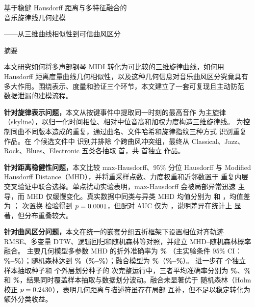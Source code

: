 \documentclass[UTF8,a4paper,12pt]{ctexart}
\newcommand{\abstractdata}[1]{{\bfseries\boldmath #1}}
\begin{document}
\thispagestyle{plain}

\begin{center}
  {\heiti{} 基于稳健 Hausdorff 距离与多特征融合的\\[0.18em]
  音乐旋律线几何建模\par}
  \vspace{0.3em}
  {\kaishu{}——从三维曲线相似性到可信曲风区分\par}
  \vspace{0.75em}
  {\heiti{} 摘\quad 要}
\end{center}

本文研究如何将多声部钢琴 MIDI 转化为可比较的三维旋律曲线，如何用
Hausdorff 距离度量曲线几何相似性，以及这种几何信息对音乐曲风区分究竟具有
多大作用。围绕表示、度量和验证三个环节，本文建立了一套可复现且主动防范
数据泄漏的建模流程。

\textbf{针对旋律表示问题，}本文从按键事件中提取同一时刻的最高音作
为主旋律（skyline），以归一化时间相位、相对中位音高和加权力度构造三维旋律线。
为控制同曲不同版本造成的重复，通过曲名、文件哈希和旋律指纹三种方式
识别重复作品。在 \abstractdata{\RawFileCount} 个候选文件中
识别并排除 \abstractdata{\CrossGenreGroupCount} 个跨曲风冲突组，最终从 Classical、Jazz、
Rock、Blues、Electronic 五类各抽取 \abstractdata{\PerGenreCount} 首，共
\abstractdata{\SampleCount} 首独立
作品。

\textbf{针对距离稳健性问题，}本文比较 max-Hausdorff、95\% 分位 Hausdorff
与 Modified Hausdorff Distance（MHD），并将重采样点数、力度权重和近邻数置于
重复内层交叉验证中联合选择。单点扰动实验表明，max-Hausdorff 会被局部异常迅速
主导，而 MHD 仅缓慢变化。真实数据中同类与异类 MHD 均值分别为
\abstractdata{\WithinMHD} 和 \abstractdata{\BetweenMHD}，均值差为
\abstractdata{\MHDGap}；\abstractdata{\PermutationCount} 次置换
检验得到 \abstractdata{$p=0.0001$}，但配对 AUC 仅为
\abstractdata{\PairAUC}，说明差异在统计上
显著，但分布重叠较大。

\textbf{针对曲风区分问题，}本文在统一的嵌套分组五折框架下设置相位对齐轨迹
RMSE、多变量 DTW、逻辑回归和随机森林等对照，并建立 MHD--随机森林概率融合。
主要几何模型多参数 MHD 的折外准确率为 \abstractdata{\TunedMHDAcc\%}
（主实验条件 95\% CI：\abstractdata{\TunedMHDLow\%--\TunedMHDHigh\%}）；随机森林达到
\abstractdata{\RFAcc\%}（\abstractdata{\RFLow\%--\RFHigh\%}）；融合模型为
\abstractdata{\FusionAcc\%}（\abstractdata{\FusionLow\%--\FusionHigh\%}）。
进一步在 \abstractdata{\SampleSeedCount} 个独立样本抽取种子和
\abstractdata{\OuterSeedCount} 个外层划分种子的
\abstractdata{\ValidationRunCount} 次完整运行中，三者平均准确率分别为
\abstractdata{\RepeatedMHDAcc\%}、\abstractdata{\RepeatedRFAcc\%} 和
\abstractdata{\RepeatedFusionAcc\%}，结果同时覆盖样本抽取与数据划分波动。融合未显著优于
随机森林（Holm 校正 \abstractdata{$p=0.2430$}），表明几何距离与描述符虽存在局部
互补，但不足以稳定转化为额外分类收益。
\end{document}
